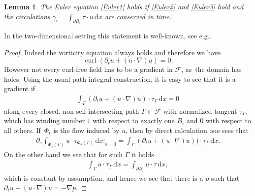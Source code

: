 \documentclass[10pt]{amsart}
\newcommand{\eg}{e.g.}
\newtheorem{lemma}[theorem]{Lemma}
\theoremstyle{definition}
\DeclareMathOperator{\curl}{curl}
\newcommand\eq{=}
\newcommand\dd{\,\mathrm{d}}
\newcommand\dx{\dd x}
\let\de\partial
\begin{document}
\begin{lemma}\label{rot pre}
The Euler equation \eqref{Euler1} holds if \eqref{Euler2} and \eqref{Euler3} hold and the circulations $\gamma_i=\int_{\de B_i}\tau\cdot u\dx$ are conserved in time.
\end{lemma}
In the two-dimensional setting this statement is well-known, see \eg \cite{filho2007vortex}.

\begin{proof}
Indeed the vorticity equation always holds and therefore we have
\[
\curl(\de_t u+(u\cdot \nabla)u)=0.
\]
However not every curl-free field has to be a gradient in $\mathcal{F}$, as~the domain has holes. Using the usual path integral construction, it is easy to see that it is a gradient if
\begin{align*}
\int_\Gamma (\de_tu+(u\cdot \nabla)u)\cdot \tau_\Gamma\dx\eq0
\end{align*}
along every closed, non-self-intersecting path $\Gamma\subset \mathcal{F}$ with normalized tangent $\tau_\Gamma$, which has winding number $1$ with respect to exactly one $B_i$ and $0$ with respect to all others. If~$\Phi_t$ is the flow induced by $u$, then by direct calculation one sees that
\begin{align*}
\de_s\int_{\Phi_s(\Gamma)}u\cdot\tau_{\Phi_s(\Gamma)}\dx\big|_{s=0}\eq\int_\Gamma (\de_tu+(u\cdot \nabla)u))\cdot \tau_\Gamma\dx.
\end{align*}
On the other hand we see that for such $\Gamma$ it holds
\begin{align*}
\int_\Gamma u\cdot\tau_\Gamma\dx\eq\int_{\de B_i} u\cdot\tau\dx,
\end{align*}
which is constant by assumption, and hence we see that there is a $p$ such that \hbox{$\de_t u+(u\cdot\nabla)u=-\nabla p$}.
\end{proof}
\end{document}
